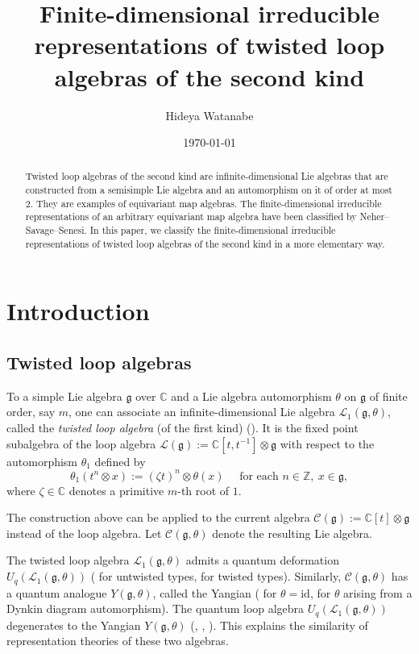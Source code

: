 \documentclass[12pt,a4paper]{amsart}
\author{Hideya Watanabe}
\date{\today}
\title[Finite-dimensional irreducible representations of TLA of the 2nd kind]{Finite-dimensional irreducible representations of twisted loop algebras of the second kind}
\theoremstyle{definition}
\numberwithin{equation}{subsection}
\begin{document}
\maketitle

\begin{abstract}
  Twisted loop algebras of the second kind are infinite-dimensional Lie algebras that are constructed from a semisimple Lie algebra and an automorphism on it of order at most $2$.
  They are examples of equivariant map algebras.
  The finite-dimensional irreducible representations of an arbitrary equivariant map algebra have been classified by Neher--Savage--Senesi.
  In this paper, we classify the finite-dimensional irreducible representations of twisted loop algebras of the second kind in a more elementary way.
\end{abstract}


\section{Introduction}
\subsection{Twisted loop algebras}
To a simple Lie algebra $\mathfrak{g}$ over $\mathbb{C}$ and a Lie algebra automorphism $\theta$ on $\mathfrak{g}$ of finite order, say $m$, one can associate an infinite-dimensional Lie algebra $\mathcal{L}_1(\mathfrak{g},\theta)$, called the \emph{twisted loop algebra} (of the first kind) (\cite[Chapter 8]{Kac83}).
It is the fixed point subalgebra of the loop algebra $\mathcal{L}(\mathfrak{g}) := \mathbb{C}[t,t^{-1}] \otimes \mathfrak{g}$ with respect to the automorphism $\theta_1$ defined by
\[
  \theta_1(t^n \otimes x) := (\zeta t)^n \otimes \theta(x) \quad \text{ for each } n \in \mathbb{Z},\ x \in \mathfrak{g},
\]
where $\zeta \in \mathbb{C}$ denotes a primitive $m$-th root of $1$.

The construction above can be applied to the current algebra $\mathcal{C}(\mathfrak{g}) := \mathbb{C}[t] \otimes \mathfrak{g}$ instead of the loop algebra.
Let $\mathcal{C}(\mathfrak{g},\theta)$ denote the resulting Lie algebra.

The twisted loop algebra $\mathcal{L}_1(\mathfrak{g},\theta)$ admits a quantum deformation $U_q(\mathcal{L}_1(\mathfrak{g},\theta))$ (\cite[Section 12.2]{ChPr94} for untwisted types, \cite{ChPr98} for twisted types).
Similarly, $\mathcal{C}(\mathfrak{g},\theta)$ has a quantum analogue $Y(\mathfrak{g},\theta)$, called the Yangian (\cite{Dri85} for $\theta = \mathrm{id}$, \cite{GuMa12} for $\theta$ arising from a Dynkin diagram automorphism).
The quantum loop algebra $U_q(\mathcal{L}_1(\mathfrak{g},\theta))$ degenerates to the Yangian $Y(\mathfrak{g,\theta})$ (\cite{Dri87}, \cite{GaTL13}, \cite{GuMa12}).
This explains the similarity of representation theories of these two algebras.
\end{document}

